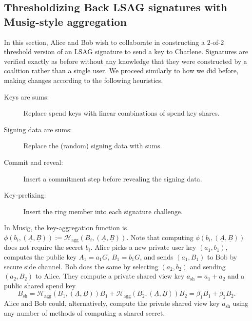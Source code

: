 \documentclass{iacrtrans}
\theoremstyle{definition}
\numberwithin{theorem}{subsection}
\numberwithin{lemma}{theorem}
\begin{document}
\subsection{Thresholdizing Back LSAG signatures with Musig-style aggregation} \label{naiveImplement}

In this section, Alice and Bob wish to collaborate in constructing a $2$-of-$2$ threshold version of an LSAG signature to send a key to Charlene. Signatures are verified exactly as before without any knowledge that they were constructed by a coalition rather than a single user. We proceed similarly to how we did before, making changes according to the following heuristics.
\begin{description}
\item [Keys are sums:] Replace spend keys with linear combinations of spend key shares.

\item [Signing data are sums:] Replace the (random) signing data with sums.

\item [Commit and reveal:] Insert a commitment step before revealing the signing data.

\item [Key-prefixing:] Insert the ring member into each signature challenge.
\end{description} 

In Musig, the key-aggregation function is $\phi(b_i, (\underline{A},\underline{B})) := \mathcal{H}_{\text{agg}}(B_i, (\underline{A}, \underline{B}))$. Note that computing $\phi(b_i, (\underline{A}, \underline{B}))$ does not require the secret $b_i$. Alice picks a new private user key $(a_1, b_1)$, computes the public key $A_1 = a_1 G$, $B_1 = b_1G$, and sends $(a_1, B_1)$ to Bob by secure side channel. Bob does the same by selecting $(a_2, b_2)$ and sending $(a_2, B_2)$ to Alice.  They compute a private shared view key $a_{\text{sh}} = a_1 + a_2$ and a public shared spend key \[B_{\text{sh}} = \mathcal{H}_{\text{agg}}(B_1, (\underline{A}, \underline{B}))B_1 + \mathcal{H}_{\text{agg}}(B_2, (\underline{A}, \underline{B}))B_2 = \beta_1 B_1 + \beta_2 B_2.\] Alice and Bob could, alternatively, compute the private shared view key $a_{\text{sh}}$ using any number of methods of computing a shared secret. 
\end{document}
